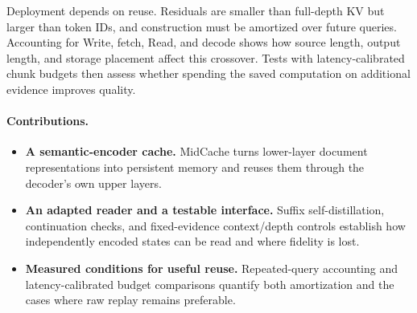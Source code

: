 Deployment depends on reuse. Residuals are smaller than full-depth KV but larger than token IDs, and construction must be amortized over future queries. Accounting for Write, fetch, Read, and decode shows how source length, output length, and storage placement affect this crossover. Tests with latency-calibrated chunk budgets then assess whether spending the saved computation on additional evidence improves quality.

\paragraph{Contributions.}
\begin{itemize}[leftmargin=1.3em,itemsep=2pt,topsep=3pt]
\item \textbf{A semantic-encoder cache.} MidCache turns lower-layer document representations into persistent memory and reuses them through the decoder's own upper layers.
\item \textbf{An adapted reader and a testable interface.} Suffix self-distillation, continuation checks, and fixed-evidence context/depth controls establish how independently encoded states can be read and where fidelity is lost.
\item \textbf{Measured conditions for useful reuse.} Repeated-query accounting and latency-calibrated budget comparisons quantify both amortization and the cases where raw replay remains preferable.
\end{itemize}
\FloatBarrier
